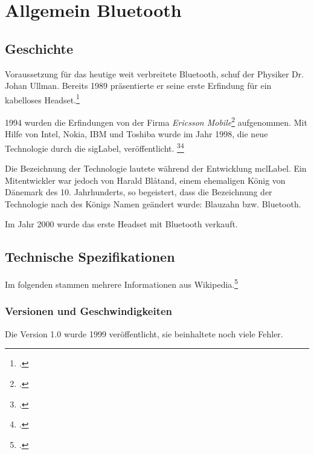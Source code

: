 \chapter{Allgemein Bluetooth}
\label{ch:general}

\section{Geschichte}
Voraussetzung für das heutige weit verbreitete Bluetooth, schuf der Physiker Dr. Johan Ullman.
Bereits 1989 präsentierte er seine erste Erfindung für ein kabelloses Headset.\footcite{Bluetooth_Wikipedia_2015-04-17}

1994 wurden die Erfindungen von der Firma \textit{Ericsson Mobile}\footcite{Ericsson_2015-04-17} aufgenommen.
Mit Hilfe von Intel, Nokia, IBM und Toshiba wurde im Jahr 1998, die neue Technologie durch die \gls{sigLabel}, veröffentlicht.
\footcite{Bluetooth_Special_Interest_Group_Wikipedia_2015-04-17}\footcite{The_history_of_Bluetooth_Ericsson_History_2015-04-17}

Die Bezeichnung der Technologie lautete während der Entwicklung \gls{mclLabel}.
Ein Mitentwickler war jedoch von Harald Bl{\aa}tand, einem ehemaligen König von Dänemark des 10. Jahrhunderts, so begeistert, dass die Bezeichnung der Technologie nach des Königs Namen geändert wurde: Blauzahn bzw. Bluetooth.

Im Jahr 2000 wurde das erste Headset mit Bluetooth verkauft.

\section{Technische Spezifikationen}
\label{sec:general_specs}
Im folgenden  stammen mehrere Informationen aus Wikipedia.\footcite{Bluetooth_Wikipedia_2015-04-17}

\subsection{Versionen und Geschwindigkeiten}
Die Version 1.0 wurde 1999 veröffentlicht, sie beinhaltete noch viele Fehler.

